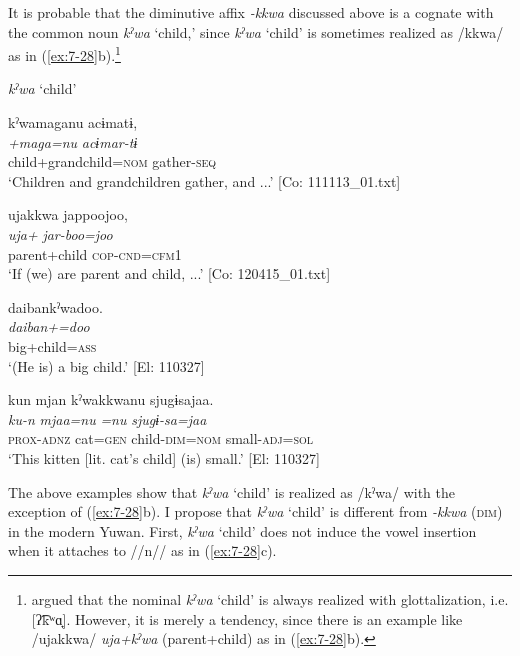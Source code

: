   It is probable that the diminutive affix \textit{{}-kkwa} discussed above is a cognate with the common noun \textit{kˀwa} ‘child,’ since \textit{kˀwa} ‘child’ is sometimes realized as /kkwa/ as in (\ref{ex:7-28}b).\footnote{\citet[39]{Niinaga2010} argued that the nominal \textit{kˀwa} ‘child’ is always realized with glottalization, i.e. [ʔ͡kʷɑ̟]. However, it is merely a tendency, since there is an example like /ujakkwa/ \textit{uja+kˀwa} (parent+child) as in (\ref{ex:7-28}b).}

\ea \label{ex:7:28}  \textit{kˀwa} ‘child’

\ea \label{ex:7:a}{\TM}
\glll  kˀwamaganu  acɨmatɨ,\\
\textit{+maga=nu}  \textit{acɨmar-tɨ}\\
child+grandchild=\textsc{nom}  gather-\textsc{seq}\\
\glt ‘Children and grandchildren gather, and ...’ [Co: 111113\_01.txt]

\ex \label{ex:7:b}{\TM}
\glll  ujakkwa  jappoojoo,\\
\textit{uja+}  \textit{jar-boo=joo}\\
parent+child  \textsc{cop}-\textsc{cnd}=\textsc{cfm}1\\
\glt ‘If (we) are parent and child, ...’ [Co: 120415\_01.txt]

\ex \label{ex:7:c}{\TM}
\glll  daibankˀwadoo.\\
\textit{daiban+=doo}\\
big+child=\textsc{ass}\\
\glt ‘(He is) a big child.’ [El: 110327]

\ex \label{ex:7:d}{\TM}
\glll  kun  mjan  kˀwakkwanu  sjugɨsajaa.\\
\textit{ku-n}  \textit{mjaa=nu}  \textit{=nu}  \textit{sjugɨ-sa=jaa}\\
\textsc{prox}-\textsc{adnz}  cat=\textsc{gen}  child-\textsc{dim}=\textsc{nom}  small-\textsc{adj}=\textsc{sol}\\
\glt ‘This kitten [lit. cat’s child] (is) small.’ [El: 110327]

\z
\z

The above examples show that \textit{kˀwa} ‘child’ is realized as /kˀwa/ with the exception of (\ref{ex:7-28}b). I propose that \textit{kˀwa} ‘child’ is different from \textit{{}-kkwa} (\textsc{dim}) in the modern Yuwan. First, \textit{kˀwa} ‘child’ does not induce the vowel insertion when it attaches to //n// as in (\ref{ex:7-28}c).

